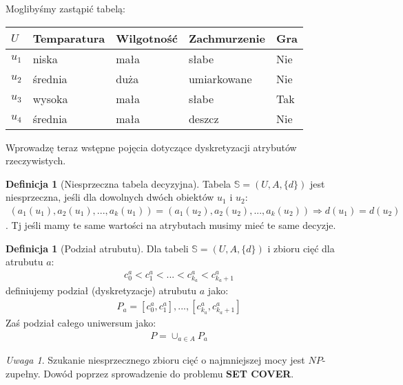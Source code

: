 \documentclass[magisterska]{pracamgr}
\theoremstyle{plain}
\theoremstyle{definition}
\newtheorem{definicja}[thm]{Definicja}
\theoremstyle{remark}
\newtheorem{uwaga}[thm]{Uwaga}
\begin{document}
Moglibyśmy zastąpić tabelą:

\begin{center}
 \begin{tabular}{l || P{2.5cm} P{2.5cm} P{2.5cm} | P{1.5cm}}
  $U$     & Temparatura & Wilgotność & Zachmurzenie & Gra \\ 
  \hline
  $u_{1}$ & niska      & mała      & słabe          & Nie \\
  $u_{2}$ & średnia    & duża      & umiarkowane    & Nie \\
  $u_{3}$ & wysoka     & mała      & słabe   	    & Tak \\
  $u_{4}$ & średnia    & mała      & deszcz         & Nie \\
 \end{tabular}
\end{center}

\newpage
Wprowadzę teraz wstępne pojęcia dotyczące dyskretyzacji atrybutów rzeczywistych.


\begin{definicja}[Niesprzeczna tabela decyzyjna]
Tabela  $\mathbb{S} =(U, A, \{d\} )$  jest niesprzeczna, jeśli dla dowolnych dwóch obiektów $u_{1}$ i $u_{2}$:
  \begin{align*}
     (a_{1}(u_{1}), a_{2}(u_{1}), ..., a_{k}(u_{1})) = (a_{1}(u_{2}), a_{2}(u_{2}), ..., a_{k}(u_{2})) \Rightarrow 
     d(u_{1}) = d(u_{2})
  \end{align*}.
Tj jeśli mamy te same wartości na atrybutach musimy mieć te same decyzje.
\end{definicja}

\begin{definicja}[Podział atrubutu]
Dla tabeli  $\mathbb{S} =(U, A, \{d\} )$  i zbioru cięć dla atrubutu $a$:
\begin{align*}
     c_{0}^{a} < c_{1}^{a} < ... < c_{k_{a}}^{a} < c_{k_{a} + 1}^{a}
  \end{align*}
definiujemy podział (dyskretyzacje) atrubutu $a$ jako:
  \begin{align*}
     P_{a} = {[c_{0}^{a}, c_{1}^{a}], ... , [c_{k_{a}}^{a}, c_{k_{a} + 1}^{a}]}
  \end{align*}
Zaś podział całego uniwersum jako:
  \begin{align*}
     P = \cup_{a \in A} P_{a}
  \end{align*}
\end{definicja}

\begin{uwaga}
Szukanie niesprzecznego zbioru cięć o najmniejszej mocy jest $NP$-zupełny.
Dowód poprzez sprowadzenie do problemu \textbf{SET COVER}.
\end{uwaga}
\end{document}
